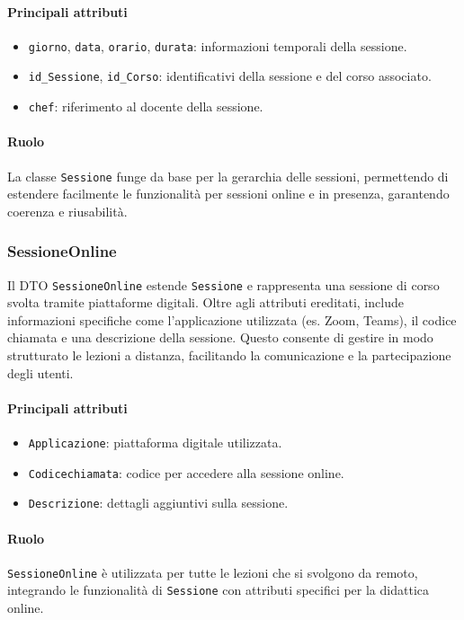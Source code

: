 \paragraph{Principali attributi}
\begin{itemize}
    \item \texttt{giorno}, \texttt{data}, \texttt{orario}, \texttt{durata}: informazioni temporali della sessione.
    \item \texttt{id\_Sessione}, \texttt{id\_Corso}: identificativi della sessione e del corso associato.
    \item \texttt{chef}: riferimento al docente della sessione.
\end{itemize}

\paragraph{Ruolo}
La classe \texttt{Sessione} funge da base per la gerarchia delle sessioni, permettendo di estendere facilmente le funzionalità per sessioni online e in presenza, garantendo coerenza e riusabilità.

\subsubsection{SessioneOnline}
Il DTO \texttt{SessioneOnline} estende \texttt{Sessione} e rappresenta una sessione di corso svolta tramite piattaforme digitali. Oltre agli attributi ereditati, include informazioni specifiche come l'applicazione utilizzata (es. Zoom, Teams), il codice chiamata e una descrizione della sessione. Questo consente di gestire in modo strutturato le lezioni a distanza, facilitando la comunicazione e la partecipazione degli utenti.

\paragraph{Principali attributi}
\begin{itemize}
    \item \texttt{Applicazione}: piattaforma digitale utilizzata.
    \item \texttt{Codicechiamata}: codice per accedere alla sessione online.
    \item \texttt{Descrizione}: dettagli aggiuntivi sulla sessione.
\end{itemize}

\paragraph{Ruolo}
\texttt{SessioneOnline} è utilizzata per tutte le lezioni che si svolgono da remoto, integrando le funzionalità di \texttt{Sessione} con attributi specifici per la didattica online.

